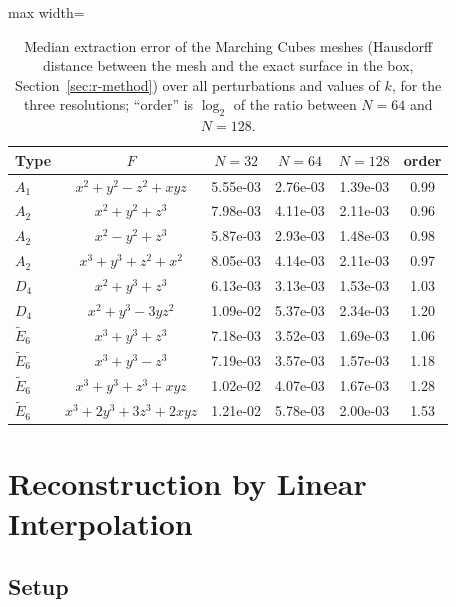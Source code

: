 \documentclass[12pt, a4paper, oneside]{book}
\theoremstyle{plain}
\theoremstyle{definition}
\theoremstyle{remark}
\theoremstyle{definition}
\begin{document}
\begin{table}[!h]
\centering
\small
\begin{adjustbox}{max width=\textwidth}
\begin{tabular}{l c c c c c}
\toprule
Type & $F$ & $N=32$ & $N=64$ & $N=128$ & order \\
\midrule
$A_1$ & $x^2+y^2-z^2+xyz$ & 5.55e-03 & 2.76e-03 & 1.39e-03 & 0.99 \\
$A_2$ & $x^2+y^2+z^3$ & 7.98e-03 & 4.11e-03 & 2.11e-03 & 0.96 \\
$A_2$ & $x^2-y^2+z^3$ & 5.87e-03 & 2.93e-03 & 1.48e-03 & 0.98 \\
$A_2$ & $x^3+y^3+z^2+x^2$ & 8.05e-03 & 4.14e-03 & 2.11e-03 & 0.97 \\
$D_4$ & $x^2+y^3+z^3$ & 6.13e-03 & 3.13e-03 & 1.53e-03 & 1.03 \\
$D_4$ & $x^2+y^3-3yz^2$ & 1.09e-02 & 5.37e-03 & 2.34e-03 & 1.20 \\
$\tilde E_6$ & $x^3+y^3+z^3$ & 7.18e-03 & 3.52e-03 & 1.69e-03 & 1.06 \\
$\tilde E_6$ & $x^3+y^3-z^3$ & 7.19e-03 & 3.57e-03 & 1.57e-03 & 1.18 \\
$\tilde E_6$ & $x^3+y^3+z^3+xyz$ & 1.02e-02 & 4.07e-03 & 1.67e-03 & 1.28 \\
$\tilde E_6$ & $x^3+2y^3+3z^3+2xyz$ & 1.21e-02 & 5.78e-03 & 2.00e-03 & 1.53 \\
\bottomrule
\end{tabular}
\end{adjustbox}
\caption[Extraction error]{Median extraction error of the Marching Cubes meshes (Hausdorff distance between the mesh and the exact surface in the box, Section~\ref{sec:r-method}) over all perturbations and values of $k$, for the three resolutions; ``order'' is $\log_2$ of the ratio between $N=64$ and $N=128$.}
\label{tab:extraction-error}
\end{table}

\section{Reconstruction by Linear Interpolation}
\label{sec:r-interp-results}

\subsection{Setup}
\label{sec:r-interp-setup}
\end{document}
